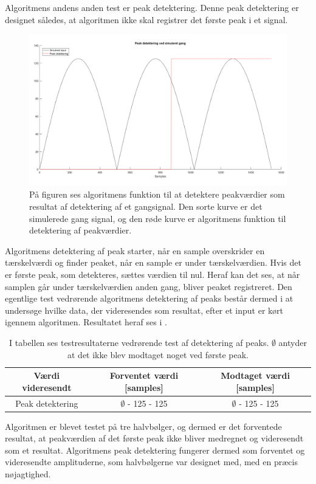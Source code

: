 Algoritmens andens anden test er peak detektering. Denne peak detektering er designet således, at algoritmen ikke skal registrer det første peak i et signal.
\begin{figure}[H]
	\centering
	\includegraphics[scale=0.3]{figures/cDesign/test_peak_gang.png}
	\caption{På figuren ses algoritmens funktion til at detektere peakværdier som resultat af detektering af et gangsignal. Den sorte kurve er det simulerede gang signal, og den røde kurve er algoritmens funktion til detektering af peakværdier.}
	\label{fig:test_peak_gang}
\end{figure}
Algoritmens detektering af peak starter, når en sample overskrider en tærskelværdi og finder peaket, når en sample er under tærskelværdien. Hvis det er første peak, som detekteres, sættes værdien til nul. Heraf kan det ses, at når samplen går under tærskelværdien anden gang, bliver peaket registreret. Den egentlige test vedrørende algoritmens detektering af peaks består dermed i at undersøge hvilke data, der videresendes som resultat, efter et input er kørt igennem algoritmen. Resultatet heraf ses i .
\begin{table}[H]
	\centering
	\begin{tabular}{ccc}
		\hline
		\rowcolor[HTML]{C0C0C0} 
		Værdi videresendt & Forventet værdi [samples] & Modtaget værdi [samples] \\ \hline
		Peak detektering & $\emptyset$ - 125 - 125 & $\emptyset$ - 125 - 125 \\ \hline
	\end{tabular}
	\caption{I tabellen ses testresultaterne vedrørende test af detektering af peaks. $\emptyset$ antyder at det ikke blev modtaget noget ved første peak.}
	\label{tab:test_res_peak}
\end{table}\vspace{-0.5cm}
Algoritmen er blevet testet på tre halvbølger, og dermed er det forventede resultat, at peakværdien af det første peak ikke bliver medregnet og videresendt som et resultat. Algoritmens peak detektering fungerer dermed som forventet og videresendte amplituderne, som halvbølgerne var designet med, med en præcis nøjagtighed.

